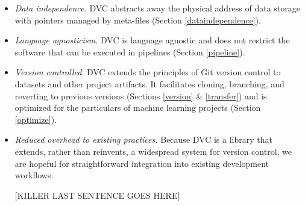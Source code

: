 \documentclass[10pt,sigconf, authordraft]{acmart}
\begin{document}
\begin{itemize}
    \item \textit{Data independence.} DVC abstracts away the physical address of data storage with pointers managed by meta-files (Section \ref{dataindependence}). 
    \item \textit{Language agnosticism.} DVC is language agnostic and does not restrict the software that can be executed in pipelines (Section \ref{pipeline}). 
    \item \textit{Version controlled}. DVC extends the principles of Git version control to datasets and other project artifacts. It facilitates cloning, branching, and reverting to previous versions (Sections \ref{version} \& \ref{transfer}) and is optimized for the particulars of machine learning projects (Section \ref{optimize}).
    \item \textit{Reduced overhead to existing practices.} Because DVC is a library that extends, rather than reinvents, a widespread system for version control, we are hopeful for straightforward integration into existing development workflows.

[KILLER LAST SENTENCE GOES HERE]

\end{itemize}
    
    






\end{document}

